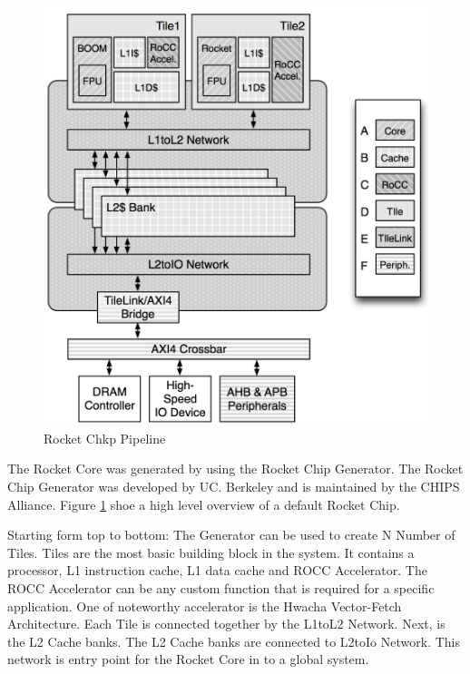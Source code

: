 \documentclass[../main.tex]{subfiles}
\begin{document}
\begin{figure}
    \centering
    \includegraphics[scale=.5]{pngs/RocketChipGeneratorLayout.png}
    \caption{Rocket Chkp Pipeline\cite{Asanović:EECS-2016-17}}
    \label{fig:RocketCipGen}
\end{figure}

The Rocket Core was generated by using the Rocket Chip Generator. The Rocket Chip Generator was developed by UC. Berkeley and is maintained by the CHIPS Alliance. Figure \ref{fig:RocketCipGen} shoe a high level overview of a default Rocket Chip. 

Starting form top to bottom: The Generator can be used to create N Number of Tiles. Tiles are the most basic building block in the system. It contains a processor, L1 instruction cache, L1 data cache and ROCC Accelerator. The ROCC Accelerator can be any custom function that is required for a specific application. One of noteworthy accelerator is the Hwacha Vector-Fetch Architecture\cite{HwachaPaper}. Each Tile is connected together by the L1toL2 Network. Next, is the L2 Cache banks. The L2 Cache banks are connected to L2toIo Network. This network is entry point for the Rocket Core in to a global system.
\end{document}

